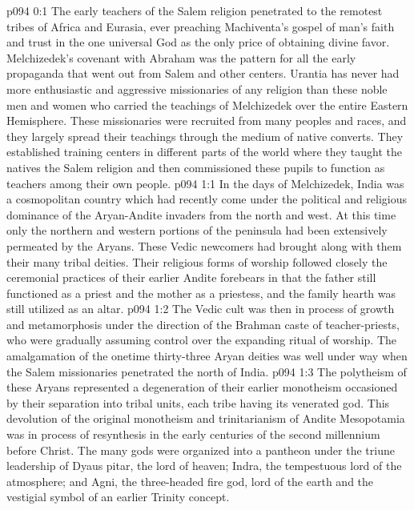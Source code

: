 \author{Melchizedek}
\vs p094 0:1 The early teachers of the Salem religion penetrated to the remotest tribes of Africa and Eurasia, ever preaching Machiventa’s gospel of man’s faith and trust in the one universal God as the only price of obtaining divine favor. Melchizedek’s covenant with Abraham was the pattern for all the early propaganda that went out from Salem and other centers. Urantia has never had more enthusiastic and aggressive missionaries of any religion than these noble men and women who carried the teachings of Melchizedek over the entire Eastern Hemisphere. These missionaries were recruited from many peoples and races, and they largely spread their teachings through the medium of native converts. They established training centers in different parts of the world where they taught the natives the Salem religion and then commissioned these pupils to function as teachers among their own people.\plusone
{}
\vs p094 1:1 In the days of Melchizedek, India was a cosmopolitan country which had recently come under the political and religious dominance of the Aryan\hyp{}Andite invaders from the north and west. At this time only the northern and western portions of the peninsula had been extensively permeated by the Aryans. These Vedic newcomers had brought along with them their many tribal deities. Their religious forms of worship followed closely the ceremonial practices of their earlier Andite forebears in that the father still functioned as a priest and the mother as a priestess, and the family hearth was still utilized as an altar.
\vs p094 1:2 The Vedic cult was then in process of growth and metamorphosis under the direction of the Brahman caste of teacher\hyp{}priests, who were gradually assuming control over the expanding ritual of worship. The amalgamation of the onetime thirty\hyp{}three Aryan deities was well under way when the Salem missionaries penetrated the north of India.
\vs p094 1:3 The polytheism of these Aryans represented a degeneration of their earlier monotheism occasioned by their separation into tribal units, each tribe having its venerated god. This devolution of the original monotheism and trinitarianism of Andite Mesopotamia was in process of resynthesis in the early centuries of the second millennium before Christ. The many gods were organized into a pantheon under the triune leadership of Dyaus pitar, the lord of heaven; Indra, the tempestuous lord of the atmosphere; and Agni, the three\hyp{}headed fire god, lord of the earth and the vestigial symbol of an earlier Trinity concept.
